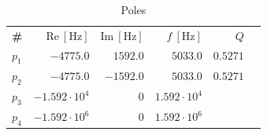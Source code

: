 \begin{table}[h]
\centering
\begin{tabular}[c]{lrrrrr}
\textbf{\#} & \textbf{$\mathrm{Re}\ [\mathrm{Hz}]$} & \textbf{$\mathrm{Im}\ [\mathrm{Hz}]$} & \textbf{$f\ [\mathrm{Hz}]$} & \textbf{$Q$} \\ 
\rowcolor{myyellow}
$p_{1}$ &$-4775.0$ &$1592.0$ &$5033.0$ &$0.5271$ \\ 
$p_{2}$ &$-4775.0$ &$-1592.0$ &$5033.0$ &$0.5271$ \\ 
\rowcolor{myyellow}
$p_{3}$ &$-1.592 \cdot 10^{4}$ &$0$ &$1.592 \cdot 10^{4}$ \\ 
$p_{4}$ &$-1.592 \cdot 10^{6}$ &$0$ &$1.592 \cdot 10^{6}$ \\ 
\end{tabular}
\caption{Poles}
\end{table}

